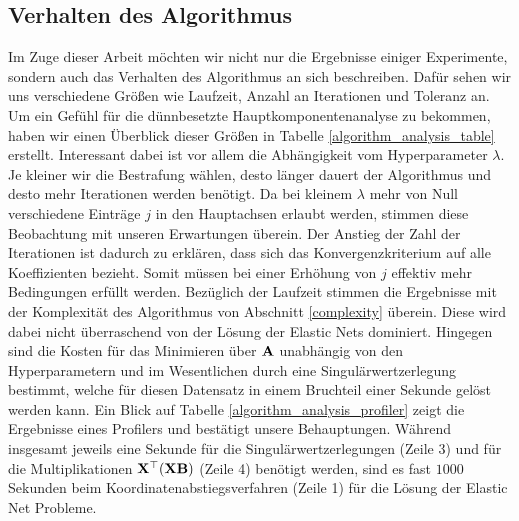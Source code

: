 

\subsection{Verhalten des Algorithmus}

Im Zuge dieser Arbeit möchten wir nicht nur die Ergebnisse einiger Experimente, sondern auch das Verhalten des Algorithmus an sich beschreiben. Dafür sehen wir uns verschiedene Größen wie Laufzeit, Anzahl an Iterationen und Toleranz an. Um ein Gefühl für die dünnbesetzte Hauptkomponentenanalyse zu bekommen, haben wir einen Überblick dieser Größen in Tabelle \ref{algorithm_analysis_table} erstellt. Interessant dabei ist vor allem die Abhängigkeit vom Hyperparameter $\lambda$. Je kleiner wir die Bestrafung wählen, desto länger dauert der Algorithmus und desto mehr Iterationen werden benötigt. Da bei kleinem $\lambda$ mehr von Null verschiedene Einträge $j$ in den Hauptachsen erlaubt werden, stimmen diese Beobachtung mit unseren Erwartungen überein. Der Anstieg der Zahl der Iterationen ist dadurch zu erklären, dass sich das Konvergenzkriterium auf alle Koeffizienten bezieht. Somit müssen bei einer Erhöhung von $j$ effektiv mehr Bedingungen erfüllt werden. Bezüglich der Laufzeit stimmen die Ergebnisse mit der Komplexität des Algorithmus von Abschnitt \ref{complexity} überein. Diese wird dabei nicht überraschend von der Lösung der Elastic Nets dominiert. Hingegen sind die Kosten für das Minimieren über $\mathbf{A}$ unabhängig von den Hyperparametern und im Wesentlichen durch eine Singulärwertzerlegung bestimmt, welche für diesen Datensatz in einem Bruchteil einer Sekunde gelöst werden kann. Ein Blick auf Tabelle \ref{algorithm_analysis_profiler} zeigt die Ergebnisse eines Profilers und bestätigt unsere Behauptungen. Während insgesamt jeweils eine Sekunde für die Singulärwertzerlegungen (Zeile 3) und für die Multiplikationen $\mathbf{X}^{\top} (\mathbf{X} \mathbf{B})$ (Zeile 4) benötigt werden, sind es fast $1000$ Sekunden beim Koordinatenabstiegsverfahren (Zeile 1) für die Lösung der Elastic Net Probleme.

